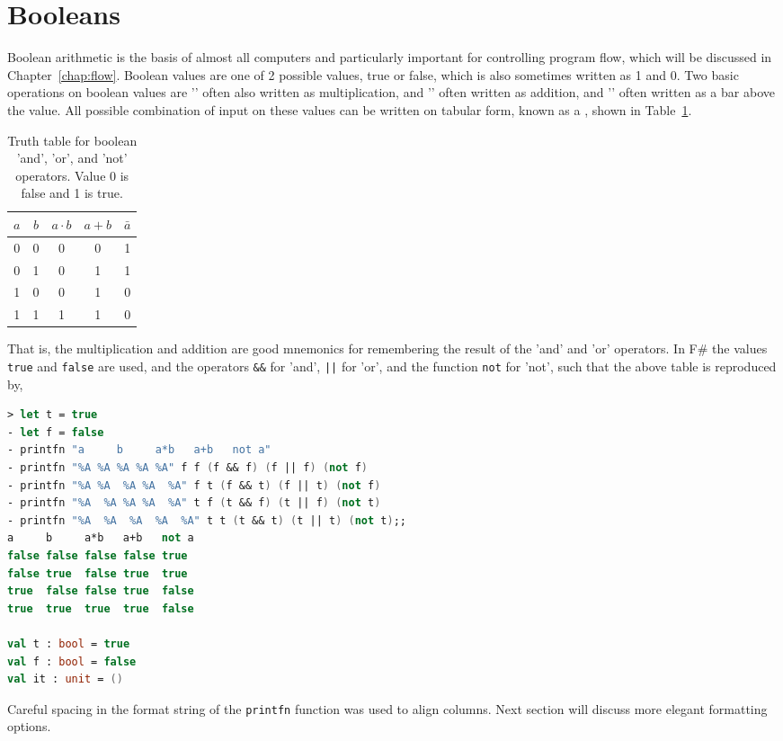 \section{Booleans}
Boolean arithmetic is the basis of almost all computers and particularly important for controlling program flow, which will be discussed in Chapter~\ref{chap:flow}. Boolean values are one of 2 possible values, true or false, which is also sometimes written as 1 and 0. Two basic operations on boolean values are '' often also written as multiplication, and '' often written as addition, and '' often written as a bar above the value. All possible combination of input on these values can be written on tabular form, known as a , shown in Table~\ref{tab:truthTable}.
\begin{table}
  \centering
  \begin{tabular}{|c|c|c|c|c|}
    \hline
    $a$ & $b$ & $a\cdot b$& $a + b$&$\bar{a}$\\
    \hline
    0&0&0&0&1\\
    0&1&0&1&1\\
    1&0&0&1&0\\
    1&1&1&1&0\\
    \hline
  \end{tabular}
  \caption{Truth table for boolean 'and', 'or', and 'not' operators. Value 0 is false and 1 is true.}
  \label{tab:truthTable}
\end{table}
That is, the multiplication and addition are good mnemonics for remembering the result of the 'and' and 'or' operators. In F\# the values \lstinline|true| and \lstinline|false| are used, and the operators \lstinline|&&| for 'and', \lstinline+||+ for 'or', and the function \lstinline|not| for 'not', such that the above table is reproduced by,
%
\begin{lstlisting}[language=fsharp,caption={fsharpi, boolean operators and truth tables.}]
> let t = true
- let f = false
- printfn "a     b     a*b   a+b   not a"                                       
- printfn "%A %A %A %A %A" f f (f && f) (f || f) (not f)
- printfn "%A %A  %A %A  %A" f t (f && t) (f || t) (not f)
- printfn "%A  %A %A %A  %A" t f (t && f) (t || f) (not t)
- printfn "%A  %A  %A  %A  %A" t t (t && t) (t || t) (not t);;
a     b     a*b   a+b   not a
false false false false true
false true  false true  true
true  false false true  false
true  true  true  true  false

val t : bool = true
val f : bool = false
val it : unit = ()
\end{lstlisting}
%
Careful spacing in the format string of the \lstinline|printfn| function was used to align columns. Next section will discuss more elegant formatting options.


